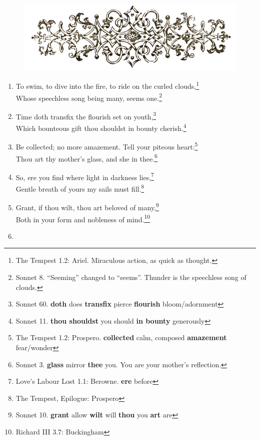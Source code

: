\documentclass[17pt,twoside]{extarticle}
\begin{document}
\thispagestyle{empty}

\begin{figure}[htbp]
\centering
\includegraphics[width=15.5cm]{images/frontispiece.png}
\end{figure}


\begin{enumerate}
\item
  To swim, to dive into the fire, to ride on the curled
  clouds,\footnote{The Tempest 1.2: Ariel. Miraculous action, as quick
    as thought.}\\Whose speechless song being many, seems one.\footnote{Sonnet
    8. ``Seeming'' changed to ``seems''. Thunder is the speechless song
    of clouds.}
\item
  Time doth transfix the flourish set on youth,\footnote{Sonnet 60.
    \textbf{doth} does \textbf{transfix} pierce \textbf{flourish}
    bloom/adornment}\\Which bounteous gift thou shouldst in bounty
  cherish.\footnote{Sonnet 11. \textbf{thou shouldst} you should
    \textbf{in bounty} generously}
\item
  Be collected; no more amazement. Tell your piteous heart:\footnote{The
    Tempest 1.2: Prospero. \textbf{collected} calm, composed
    \textbf{amazement} fear/wonder}\\Thou art thy mother's glass, and
  she in thee.\footnote{Sonnet 3. \textbf{glass} mirror \textbf{thee}
    you. You are your mother's reflection.}
\item
  So, ere you find where light in darkness lies,\footnote{Love's Labour
    Lost 1.1: Berowne. \textbf{ere} before}\\Gentle breath of yours my
  sails must fill.\footnote{The Tempest, Epilogue: Prospero}
\item
  Grant, if thou wilt, thou art beloved of many,\footnote{Sonnet 10.
    \textbf{grant} allow \textbf{wilt} will \textbf{thou} you
    \textbf{art} are}\\Both in your form and nobleness of
  mind.\footnote{Richard III 3.7: Buckingham}
\item

\end{enumerate}
\end{document}
